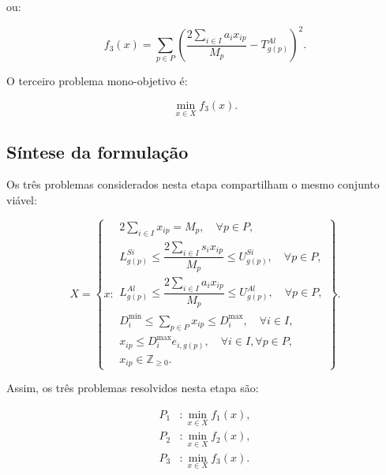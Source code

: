 \documentclass[12pt,a4paper]{article}
\begin{document}
ou:

\begin{equation}
\boxed{
f_3(x)=
\sum_{p\in P}
\left(
\frac{
2\sum_{i\in I}a_i x_{ip}
}{
M_p
}
-
T_{g(p)}^{Al}
\right)^2.
}
\end{equation}

O terceiro problema mono-objetivo é:

\begin{equation}
\boxed{
\min_{x\in X} f_3(x).
}
\end{equation}



\subsection{Síntese da formulação}

Os três problemas considerados nesta etapa compartilham o mesmo conjunto
viável:

\begin{equation}
X =
\left\{
x :
\begin{array}{l}
2\displaystyle\sum_{i\in I}x_{ip}=M_p,
\quad \forall p\in P,
\\[3mm]

L_{g(p)}^{Si}
\leq
\dfrac{
2\displaystyle\sum_{i\in I}s_i x_{ip}
}{
M_p
}
\leq
U_{g(p)}^{Si},
\quad \forall p\in P,
\\[4mm]

L_{g(p)}^{Al}
\leq
\dfrac{
2\displaystyle\sum_{i\in I}a_i x_{ip}
}{
M_p
}
\leq
U_{g(p)}^{Al},
\quad \forall p\in P,
\\[4mm]

D_i^{\min}
\leq
\displaystyle\sum_{p\in P}x_{ip}
\leq
D_i^{\max},
\quad \forall i\in I,
\\[3mm]

x_{ip}
\leq
D_i^{\max}e_{i,g(p)},
\quad \forall i\in I,\forall p\in P,
\\[3mm]

x_{ip}\in\mathbb{Z}_{\geq0}.
\end{array}
\right\}.
\end{equation}

Assim, os três problemas resolvidos nesta etapa são:

\begin{align}
P_1 &: \min_{x\in X} f_1(x),\\
P_2 &: \min_{x\in X} f_2(x),\\
P_3 &: \min_{x\in X} f_3(x).
\end{align}
\end{document}
